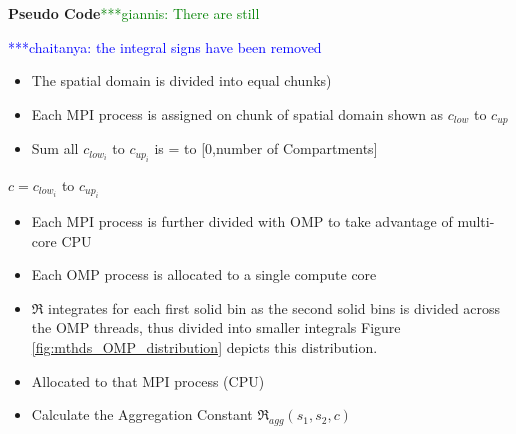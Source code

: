 \documentclass[preprint,11pt,authoryear]{elsarticle}
\newcommand{\csnote}[1]{ {\textcolor{blue} { ***chaitanya: #1 }}}
\newcommand{\gpnote}[1]{{\textcolor{green} {***giannis: #1}}}
\newcommand{\csnote}[1]{}
\newcommand{\gpnote}[1]{}
\begin{document}
\begin{algorithm}[H]
\caption*{\textbf{Pseudo Code}\gpnote{There are still }}\csnote{the integral signs have been removed}
\label{alg:MyAlgorithm}
\begin{algorithmic}[*]

\begin{itemize}[noitemsep,nolistsep,itemindent=10pt]
\item The spatial domain is divided into equal chunks)
\item Each MPI process is assigned on chunk of spatial domain shown as $c_{low}$ to $c_{up}$ 
\item Sum all $c_{low_i}$ to $c_{up_i}$ is = to [0,number of Compartments]
\end{itemize}
 $c = c_{low_i}$ to $c_{up_i}$
\begin{itemize}[noitemsep,nolistsep,itemindent=20pt]
\item Each MPI process is further divided with OMP to take advantage of multi-core CPU
\item Each OMP process is allocated to a single compute core
\item $\Re$ integrates for each first solid bin as the second solid bins is 
divided across the OMP threads, thus 
divided into smaller integrals 
Figure \ref{fig:mthds_OMP_distribution} depicts this distribution.
\item Allocated to that MPI process (CPU)
\end{itemize}
\begin{itemize}[noitemsep,nolistsep,itemindent=30pt]
\item Calculate the Aggregation Constant $\Re_{agg}(s_1,s_2,c)$
\end{itemize}

\end{algorithmic}
\end{algorithm}
\end{document}
